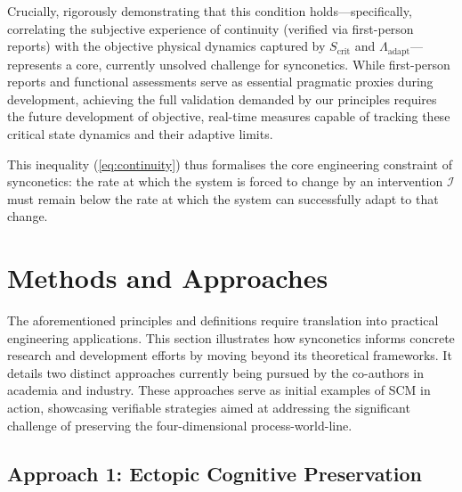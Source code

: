 \documentclass[10pt]{article}
\begin{document}
\begin{sloppypar}
\begin{itemize}
\begin{itemize}
                  Crucially, rigorously demonstrating that this condition holds—specifically, correlating the subjective experience of continuity (verified via first-person reports) with the objective physical dynamics captured by \(S_{\text{crit}}\) and \( \Lambda_{\text{adapt}} \)—represents a core, currently unsolved challenge for synconetics. While first-person reports and functional assessments serve as essential pragmatic proxies during development, achieving the full validation demanded by our principles requires the future development of objective, real-time measures capable of tracking these critical state dynamics and their adaptive limits.
          \end{itemize}

          \newpage

          This inequality (\autoref{eq:continuity}) thus formalises the core engineering constraint of synconetics: the rate at which the system is forced to change by an intervention \( \mathcal{I} \) must remain below the rate at which the system can successfully adapt to that change.
  \end{itemize}


  \section{Methods and Approaches}
  \label{sec:methods}

  The aforementioned principles and definitions require translation into practical engineering applications. This section illustrates how synconetics informs concrete research and development efforts by moving beyond its theoretical frameworks. It details two distinct approaches currently being pursued by the co-authors in academia and industry. These approaches serve as initial examples of SCM in action, showcasing verifiable strategies aimed at addressing the significant challenge of preserving the four-dimensional process-world-line.

  \subsection{Approach 1: Ectopic Cognitive Preservation}
  \label{sec:daniel-approach}


\end{sloppypar}
\end{document}
